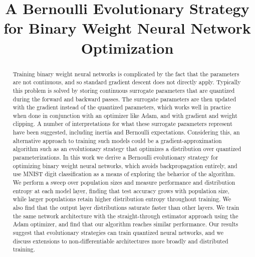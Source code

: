 \documentclass[runningheads]{llncs}
\begin{document}
\title{A Bernoulli Evolutionary Strategy for Binary Weight Neural Network Optimization}


\author{}
\authorrunning{}
\institute{}

\maketitle

\begin{abstract}
Training binary weight neural networks is complicated by the fact that the
parameters are not continuous, and so standard gradient descent does not
directly apply. Typically this problem is solved by storing continuous
surrogate parameters that are quantized during the forward and backward
passes. The surrogate parameters are then updated with the gradient instead
of the quantized parameters, which works well in practice when done in
conjunction with an optimizer like Adam, and with gradient and weight
clipping. A number of interpretations for what these surrogate parameters
represent have been suggested, including inertia and Bernoulli
expectations. Considering this, an alternative approach to training such
models could be a gradient-approximation algorithm such as an evolutionary
strategy that optimizes a distribution over quantized parameterizations.
In this work we derive a Bernoulli evolutionary strategy for optimizing
binary weight neural networks, which avoids backpropagation entirely, and
use MNIST digit classification as a means of exploring the behavior of the
algorithm. We perform a sweep over population sizes and measure performance
and distribution entropy at each model layer, finding that test accuracy
grows with population size, while larger populations retain higher
distribution entropy throughout training. We also find that the
output layer distributions saturate faster than other layers. We train the
same network architecture with the straight-through estimator approach
using the Adam optimizer, and find that our algorithm reaches similar
performance. Our results suggest that evolutionary strategies can train
quantized neural networks, and we discuss extensions to non-differentiable
architectures more broadly and distributed training.
\end{abstract}
\end{document}
